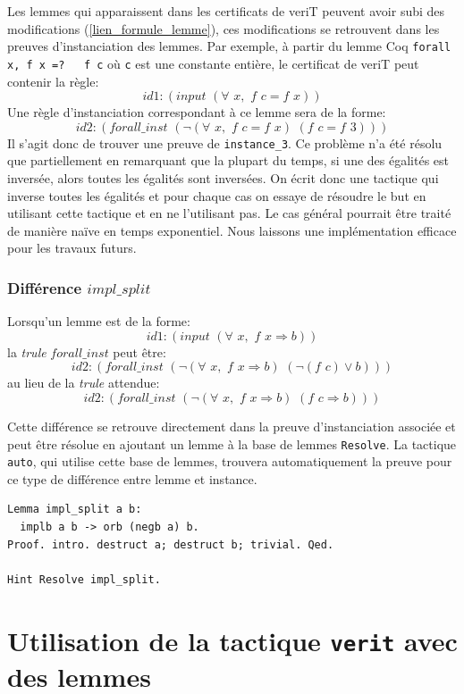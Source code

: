 \documentclass[11pt]{article}
\begin{document}
Les lemmes qui apparaissent dans les certificats de veriT peuvent avoir subi des modifications (\ref{lien_formule_lemme}), ces modifications se retrouvent dans les preuves d'instanciation des lemmes. Par exemple, à partir du lemme Coq \texttt{forall\,x, f x =?\,\,\,f c} où \texttt{c} est une constante entière, le certificat de veriT peut contenir la règle:
\[id1: (input \,\,(\forall\,\, x, \,\,f \,\,c = f \,\,x))\]
Une règle d'instanciation correspondant à ce lemme sera de la forme: 
\[id2:(forall\_inst\,\, (\neg (\forall \,\,x,\,\, f\,\, c = f \,\,x) \,\, (f\,\, c = f\,\, 3)))\]
Il s'agit donc de trouver une preuve de \texttt{instance\_3}. Ce problème n'a été résolu que partiellement en remarquant que la plupart du temps, si une des égalités est inversée, alors toutes les égalités sont inversées. On écrit donc une tactique qui inverse toutes les égalités et pour chaque cas on essaye de résoudre le but en utilisant cette tactique et en ne l'utilisant pas. Le cas général pourrait être traité de manière naïve en temps exponentiel. Nous laissons une implémentation efficace pour les travaux futurs.

\subsubsection{Différence $impl\_split$}

Lorsqu'un lemme est de la forme:
\[ id1:(input \,\,(\forall\,\, x,\,\, f \,\,x \Rightarrow b)) \]
la \textit{trule} $forall\_inst$ peut être:
\[ id2:(forall\_inst \,\, ( \neg (\forall\,\, x, \,\,f \,\, x \Rightarrow b) \,\,(\neg (f\,\, c) \vee  b))) \]
au lieu de la \textit{trule} attendue:
\[ id2:(forall\_inst  \,\,( \neg (\forall \,\,x,\,\, f\,\, x \Rightarrow b)\,\, (f \,\,c \Rightarrow b))) \]

Cette différence se retrouve directement dans la preuve d'instanciation associée et peut être résolue en ajoutant un lemme à la base de lemmes \texttt{Resolve}. La tactique \texttt{auto}, qui utilise cette base de lemmes, trouvera automatiquement la preuve pour ce type de différence entre lemme et instance.

\begin{lstlisting}[frame=single]
Lemma impl_split a b:
  implb a b -> orb (negb a) b.
Proof. intro. destruct a; destruct b; trivial. Qed.

Hint Resolve impl_split.
\end{lstlisting}



\section{Utilisation de la tactique \texttt{verit} avec des lemmes}
\end{document}

